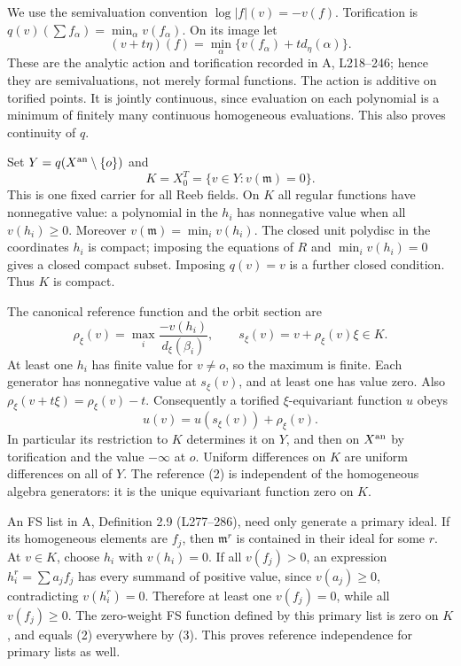 \documentclass[
  11pt,
]{article}
\begin{document}
We use the semivaluation convention \(\log|f|(v)=-v(f)\). Torification
is \(q(v)(\sum f_\alpha)=\min_\alpha v(f_\alpha)\). On its image let \[
 (v+t\eta)(f)=\min_\alpha\{v(f_\alpha)+t d_\eta(\alpha)\}.
 \tag{1}
\] These are the analytic action and torification recorded in A,
L218--246; hence they are semivaluations, not merely formal functions.
The action is additive on torified points. It is jointly continuous,
since evaluation on each polynomial is a minimum of finitely many
continuous homogeneous evaluations. This also proves continuity of
\(q\).

Set \(Y=q(X^{\rm an}\setminus\{o\})\) and \[
 K=X_0^T=\{v\in Y: v(\mathfrak m)=0\}.
\] This is one fixed carrier for all Reeb fields. On \(K\) all regular
functions have nonnegative value: a polynomial in the \(h_i\) has
nonnegative value when all \(v(h_i)\geq0\). Moreover
\(v(\mathfrak m)=\min_i v(h_i)\). The closed unit polydisc in the
coordinates \(h_i\) is compact; imposing the equations of \(R\) and
\(\min_i v(h_i)=0\) gives a closed compact subset. Imposing \(q(v)=v\)
is a further closed condition. Thus \(K\) is compact.

The canonical reference function and the orbit section are \[
 \rho_\xi(v)=\max_i\frac{-v(h_i)}{d_\xi(\beta_i)},\qquad
 s_\xi(v)=v+\rho_\xi(v)\xi\in K.                 \tag{2}
\] At least one \(h_i\) has finite value for \(v\ne o\), so the maximum
is finite. Each generator has nonnegative value at \(s_\xi(v)\), and at
least one has value zero. Also \(\rho_\xi(v+t\xi)=\rho_\xi(v)-t\).
Consequently a torified \(\xi\)-equivariant function \(u\) obeys \[
 u(v)=u(s_\xi(v))+\rho_\xi(v).                  \tag{3}
\] In particular its restriction to \(K\) determines it on \(Y\), and
then on \(X^{\rm an}\) by torification and the value \(-\infty\) at
\(o\). Uniform differences on \(K\) are uniform differences on all of
\(Y\). The reference (2) is independent of the homogeneous algebra
generators: it is the unique equivariant function zero on \(K\).

An FS list in A, Definition 2.9 (L277--286), need only generate a
primary ideal. If its homogeneous elements are \(f_j\), then
\(\mathfrak m^r\) is contained in their ideal for some \(r\). At
\(v\in K\), choose \(h_i\) with \(v(h_i)=0\). If all \(v(f_j)>0\), an
expression \(h_i^r=\sum a_j f_j\) has every summand of positive value,
since \(v(a_j)\geq0\), contradicting \(v(h_i^r)=0\). Therefore at least
one \(v(f_j)=0\), while all \(v(f_j)\geq0\). The zero-weight FS function
defined by this primary list is zero on \(K\), and equals (2) everywhere
by (3). This proves reference independence for primary lists as well.
\end{document}
